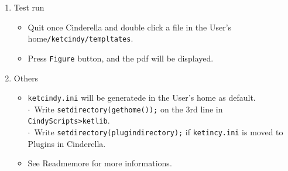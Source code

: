 \documentclass{article}
\begin{document}
\begin{enumerate}[\bf\large 1.]
\vspace{70mm}

\item Test run\vspace{-1mm}
\begin{itemize}
\item Quit once Cinderella and double click a file in the User's home\verb|/ketcindy/templtates|.\vspace{-1mm}
\item Press \verb|Figure| button, and the pdf will be displayed.\vspace{-1mm}
\end{itemize}

\item Others\vspace{-1mm}
\begin{itemize}
\item \verb|ketcindy.ini| will be generatede in the User's home as default.\\
\hspace*{5mm}$\cdot$\ Write \verb|setdirectory(gethome());| on the 3rd line in \verb|CindyScripts>ketlib|.\\
\hspace*{5mm}$\cdot$\ Write \verb|setdirectory(plugindirectory);| if \verb|ketincy.ini| is moved to Plugins in Cinderella.\vspace{-1mm}
\item See Readmemore for more informations.\vspace{-1mm}
\end{itemize}

  \end{enumerate}
\end{document}
